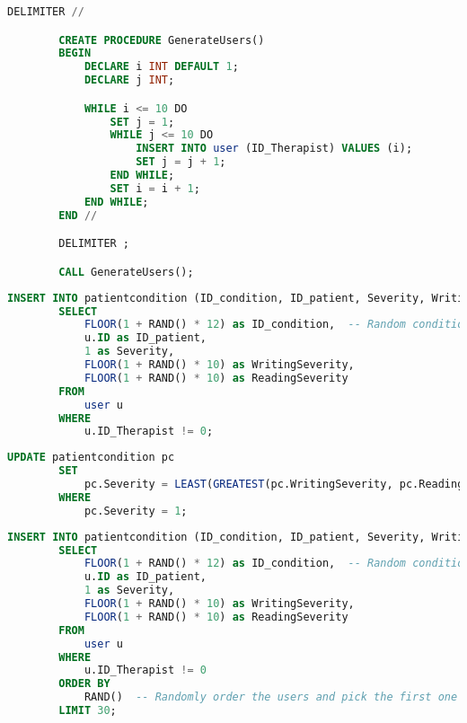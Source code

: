 \documentclass{article}
\begin{document}
    \begin{lstlisting}[language=SQL, breaklines, caption=Generazione degli utenti]
        DELIMITER //

        CREATE PROCEDURE GenerateUsers()
        BEGIN
            DECLARE i INT DEFAULT 1;
            DECLARE j INT;

            WHILE i <= 10 DO
                SET j = 1;
                WHILE j <= 10 DO
                    INSERT INTO user (ID_Therapist) VALUES (i);
                    SET j = j + 1;
                END WHILE;
                SET i = i + 1;
            END WHILE;
        END //

        DELIMITER ;

        CALL GenerateUsers();
    \end{lstlisting}
\pagebreak

    \begin{lstlisting}[language=SQL, breaklines, caption=Generazione delle severity (tutti gli user)]
        INSERT INTO patientcondition (ID_condition, ID_patient, Severity, WritingSeverity, ReadingSeverity)
        SELECT
            FLOOR(1 + RAND() * 12) as ID_condition,  -- Random condition ID (1 to 12)
            u.ID as ID_patient,
            1 as Severity,
            FLOOR(1 + RAND() * 10) as WritingSeverity,
            FLOOR(1 + RAND() * 10) as ReadingSeverity
        FROM
            user u
        WHERE
            u.ID_Therapist != 0;
    \end{lstlisting}

    \begin{lstlisting}[language=SQL, breaklines, caption=Generazione delle severity (tutti gli user) pt.2]
        UPDATE patientcondition pc
        SET
            pc.Severity = LEAST(GREATEST(pc.WritingSeverity, pc.ReadingSeverity) + IF(RAND() < 0.5, -1, 1), 10)
        WHERE
            pc.Severity = 1;
    \end{lstlisting}

    \begin{lstlisting}[language=SQL, breaklines, caption=Generazione delle severity (solo x users)]
        INSERT INTO patientcondition (ID_condition, ID_patient, Severity, WritingSeverity, ReadingSeverity)
        SELECT
            FLOOR(1 + RAND() * 12) as ID_condition,  -- Random condition ID (1 to 12)
            u.ID as ID_patient,
            1 as Severity,
            FLOOR(1 + RAND() * 10) as WritingSeverity,
            FLOOR(1 + RAND() * 10) as ReadingSeverity
        FROM
            user u
        WHERE
            u.ID_Therapist != 0
        ORDER BY
            RAND()  -- Randomly order the users and pick the first one
        LIMIT 30;
    \end{lstlisting}
\end{document}
